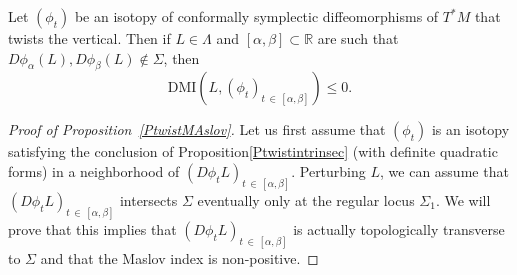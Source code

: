 \documentclass[AHL, Unicode, longabstracts, published]{cedram}
\newcommand{\DMI}{\mathrm{DMI}}
\newcommand*\R{\mathbb{R}}
\begin{document}
\begin{prop}\label{PtwistMAslov}
Let $(\phi_t)$ be an isotopy of conformally symplectic diffeomorphisms of $T^*M$ that twists the vertical. Then if $L\in\Lambda$ and $[\alpha, \beta]\subset \R$ are such that $D\phi_\alpha(L), D\phi_\beta(L)\notin \Sigma$, then
\[
\DMI\left(L, (\phi_{ t})_{t\,\in\,[\alpha, \beta]}\right)\leq 0.
\]
\end{prop}

\begin{proof}[Proof of Proposition~\ref{PtwistMAslov}]
Let us first assume that $(\phi_t)$ is an isotopy {satisfying the conclusion of Proposition\ref{Ptwistintrinsec} (with definite quadratic forms) in a neighborhood of $(D\phi_tL)_{t\,\in\,[\alpha,\beta]}$.} Perturbing $L$, we can assume that $(D\phi_{ t}L)_{t\,\in\,[\alpha, \beta]}$ intersects $\Sigma$ eventually only at the regular locus $\Sigma_1$. We will prove that this implies that $(D\phi_{ t}L)_{t\,\in\,[\alpha, \beta]}$ is actually topologically transverse to $\Sigma$ and that the Maslov index is non-positive.


\end{proof}
\end{document}
